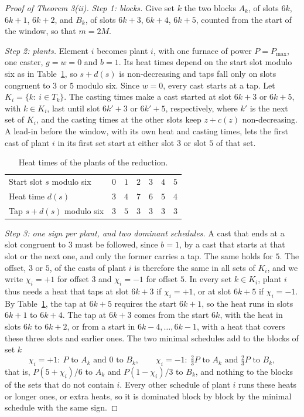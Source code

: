 \documentclass[11pt]{article}
\begin{document}
\begin{proof}[Proof of Theorem 3(ii)]
\emph{Step 1: blocks.} Give set $k$ the two blocks $A_k$, of slots $6k$, $6k+1$, $6k+2$, and $B_k$, of slots $6k+3$,
$6k+4$, $6k+5$, counted from the start of the window, so that $m=2M$.

\emph{Step 2: plants.} Element $i$ becomes plant $i$, with one furnace of power $P=P_{\max}$, one caster, $g=w=0$ and
$b=1$. Its heat times depend on the start slot modulo six as in Table~\ref{tab:gadget}, so $s+d(s)$ is non-decreasing
and taps fall only on slots congruent to $3$ or $5$ modulo six. Since $w=0$, every cast starts at a tap. Let
$K_i=\{k:\ i\in T_k\}$. The casting times make a cast started at slot $6k+3$ or $6k+5$, with $k\in K_i$, last until slot
$6k'+3$ or $6k'+5$, respectively, where $k'$ is the next set of $K_i$, and the casting times at the other slots keep
$z+c(z)$ non-decreasing. A lead-in before the window, with its own heat and casting times, lets the first cast of plant
$i$ in its first set start at either slot $3$ or slot $5$ of that set.

\begin{table}[h]
\centering
\caption{Heat times of the plants of the reduction.}
\label{tab:gadget}
\begin{tabular}{lcccccc}
\toprule
Start slot $s$ modulo six & $0$ & $1$ & $2$ & $3$ & $4$ & $5$\\
Heat time $d(s)$ & $3$ & $4$ & $7$ & $6$ & $5$ & $4$\\
Tap $s+d(s)$ modulo six & $3$ & $5$ & $3$ & $3$ & $3$ & $3$\\
\bottomrule
\end{tabular}
\end{table}

\emph{Step 3: one sign per plant, and two dominant schedules.} A cast that ends at a slot congruent to $3$ must be
followed, since $b=1$, by a cast that starts at that slot or the next one, and only the former carries a tap. The same
holds for $5$. The offset, $3$ or $5$, of the casts of plant $i$ is therefore the same in all sets of $K_i$, and we write
$\chi_i=+1$ for offset $3$ and $\chi_i=-1$ for offset $5$. In every set $k\in K_i$, plant $i$ thus needs a heat that taps
at slot $6k+3$ if $\chi_i=+1$, or at slot $6k+5$ if $\chi_i=-1$. By Table~\ref{tab:gadget}, the tap at $6k+5$ requires
the start $6k+1$, so the heat runs in slots $6k+1$ to $6k+4$. The tap at $6k+3$ comes from the start $6k$, with the
heat in slots $6k$ to $6k+2$, or from a start in $6k-4,\dots,6k-1$, with a heat that covers these three slots and
earlier ones. The two minimal schedules add to the blocks of set $k$
\[
\chi_i=+1:\ P\text{ to }A_k\text{ and }0\text{ to }B_k,\qquad
\chi_i=-1:\ \tfrac23P\text{ to }A_k\text{ and }\tfrac23P\text{ to }B_k,
\]
that is, $P(5+\chi_i)/6$ to $A_k$ and $P(1-\chi_i)/3$ to $B_k$, and nothing to the blocks of the sets that do not contain
$i$. Every other schedule of plant $i$ runs these heats or longer ones, or extra heats, so it is dominated block by
block by the minimal schedule with the same sign.


\end{proof}
\end{document}
